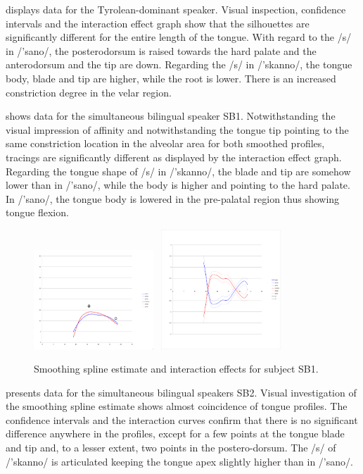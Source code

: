 \documentclass[output=paper]{LSP/langsci}
\begin{document}
 displays data for the Tyrolean-dominant speaker. Visual inspection, confidence intervals and the interaction effect graph show that the silhouettes are significantly different for the entire length of the tongue. With regard to the /s/ in /'sano/, the posterodorsum is raised towards the hard palate and the anterodorsum and the tip are down. Regarding the /s/ in /'skanno/, the tongue body, blade and tip are higher, while the root is lower. There is an increased constriction degree in the velar region.

 shows data for the simultaneous bilingual speaker SB1. Notwithstanding the visual impression of affinity and notwithstanding the tongue tip pointing to the same constriction location in the alveolar area for both smoothed profiles, tracings are significantly different as displayed by the interaction effect graph. Regarding the tongue shape of /s/ in /'skanno/, the blade and tip are somehow lower than in /'sano/, while the body is higher and pointing to the hard palate. In /'sano/, the tongue body is lowered in the pre-palatal region thus showing tongue flexion.

  
\begin{figure}
\includegraphics[width=0.4\textwidth]{illustrations/sprea_fig3a}~
\includegraphics[width=0.4\textwidth]{illustrations/sprea_fig3b}
\label{fig:3}   
\caption{Smoothing spline estimate and interaction effects for subject SB1.}
\end{figure}

 presents data for the simultaneous bilingual speakers SB2. Visual investigation of the smoothing spline estimate shows almost coincidence of tongue profiles. The confidence intervals and the interaction curves confirm that there is no significant difference anywhere in the profiles, except for a few points at the tongue blade and tip and, to a lesser extent, two points in the postero-dorsum. The /s/ of /'skanno/ is articulated keeping the tongue apex slightly higher than in /'sano/.
\end{document}
